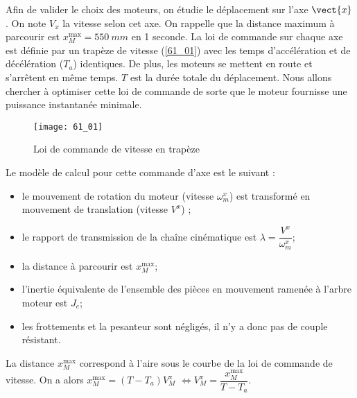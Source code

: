 \normaltrue
\correctionfalse


\setcounter{question}{0}
\ifcorrection
\else
{}
\fi

\ifprof
\else
Afin de valider le choix des moteurs, on étudie le déplacement sur l’axe $\vect{x}$.%
On note $V_x$ la vitesse selon cet axe.
On rappelle que la distance maximum à parcourir est $x_M^{\text{max}} = \SI{550}{mm}$ en 1 seconde.
La loi de commande sur chaque axe est définie par un trapèze de vitesse (\autoref{61_01})
avec les temps d’accélération et de décélération ($T_a$) identiques. De plus, les moteurs se mettent en route et s’arrêtent en
même temps. $T$ est la durée totale du déplacement. Nous allons chercher à optimiser cette loi de commande de sorte
que le moteur fournisse une puissance instantanée minimale.

\begin{figure}[H]
\centering
\texttt{[image: 61\_01]}
\caption{\label{61_01} Loi de commande de vitesse en trapèze}
\end{figure}

Le modèle de calcul pour cette commande d’axe est le suivant :
\begin{itemize}
\item le mouvement de rotation du moteur (vitesse $\omega_m^x$) est transformé en mouvement de translation (vitesse $V^x$) ;
\item le rapport de transmission de la chaîne cinématique est $\lambda = \dfrac{V^x}{\omega_m^x}$;
\item la distance à parcourir est $x_M^{\text{max}}$;
\item l’inertie équivalente de l’ensemble des pièces en mouvement ramenée à l’arbre moteur est $J_e$;
\item les frottements et la pesanteur sont négligés, il n’y a donc pas de couple résistant.
\end{itemize}
\fi
{}
\ifprof
La distance  $x_M^{\text{max}}$ correspond à l'aire sous le courbe de la loi de commande de vitesse.
On a alors 
 $x_M^{\text{max}} = \left(T-T_a\right)V_M^x$ 
 $ \Longleftrightarrow V_M^x=\dfrac{x_M^{\text{max}}}{T-T_a}$. 
\else
\fi

